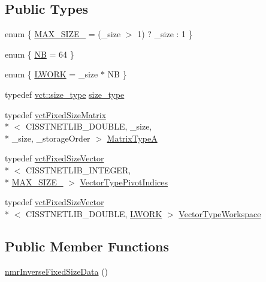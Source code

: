 \subsection*{Public Types}
\begin{DoxyCompactItemize}
\item 
enum \{ \hyperlink{classnmr_inverse_fixed_size_data_aa55ba5b1d32262c552dd42d0f2e9254fab8624d51cb7feed9f3452930fadcb46b}{M\-A\-X\-\_\-\-S\-I\-Z\-E\-\_} = (\-\_\-size $>$ 1) ? \-\_\-size \-: 1
 \}
\item 
enum \{ \hyperlink{classnmr_inverse_fixed_size_data_a580a2227fa6a510f863bc24de5909224a23462bd6af096d6bf2b131c334abb82f}{N\-B} = 64
 \}
\item 
enum \{ \hyperlink{classnmr_inverse_fixed_size_data_a42bec14855024773dd2333b9cab368baabce89457be6eebf067cb0e442a2cb35f}{L\-W\-O\-R\-K} = \-\_\-size $\ast$ N\-B
 \}
\item 
typedef \hyperlink{namespacevct_a3e2935e13aac4500965e00d30565775b}{vct\-::size\-\_\-type} \hyperlink{classnmr_inverse_fixed_size_data_a45f08ccd7186caa5300f9ff5779e1f76}{size\-\_\-type}
\item 
typedef \hyperlink{classvct_fixed_size_matrix}{vct\-Fixed\-Size\-Matrix}\\*
$<$ C\-I\-S\-S\-T\-N\-E\-T\-L\-I\-B\-\_\-\-D\-O\-U\-B\-L\-E, \-\_\-size, \\*
\-\_\-size, \-\_\-storage\-Order $>$ \hyperlink{classnmr_inverse_fixed_size_data_a3ead3c2c221bc42f4717cb0cc0aaa876}{Matrix\-Type\-A}
\item 
typedef \hyperlink{classvct_fixed_size_vector}{vct\-Fixed\-Size\-Vector}\\*
$<$ C\-I\-S\-S\-T\-N\-E\-T\-L\-I\-B\-\_\-\-I\-N\-T\-E\-G\-E\-R, \\*
\hyperlink{classnmr_inverse_fixed_size_data_aa55ba5b1d32262c552dd42d0f2e9254fab8624d51cb7feed9f3452930fadcb46b}{M\-A\-X\-\_\-\-S\-I\-Z\-E\-\_} $>$ \hyperlink{classnmr_inverse_fixed_size_data_ac8e0c496927d3fe726116c4c6ddf5af2}{Vector\-Type\-Pivot\-Indices}
\item 
typedef \hyperlink{classvct_fixed_size_vector}{vct\-Fixed\-Size\-Vector}\\*
$<$ C\-I\-S\-S\-T\-N\-E\-T\-L\-I\-B\-\_\-\-D\-O\-U\-B\-L\-E, \hyperlink{classnmr_inverse_fixed_size_data_a42bec14855024773dd2333b9cab368baabce89457be6eebf067cb0e442a2cb35f}{L\-W\-O\-R\-K} $>$ \hyperlink{classnmr_inverse_fixed_size_data_ac3e08c421f20d9f34917b2cdc03f3b34}{Vector\-Type\-Workspace}
\end{DoxyCompactItemize}
\subsection*{Public Member Functions}
\begin{DoxyCompactItemize}
\item 
\hyperlink{classnmr_inverse_fixed_size_data_aa16c2f58af1a0cce1cf0da68b290b9a2}{nmr\-Inverse\-Fixed\-Size\-Data} ()
\end{DoxyCompactItemize}
